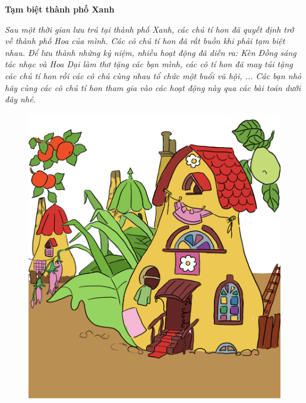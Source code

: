 	\centerline{\textbf{\color{toancuabi}Tạm biệt thành phố Xanh}}
	\vskip 0.1cm
	\begin{multicols}{2}
		\textit{Sau một thời gian lưu trú tại thành phố Xanh, các chú tí hon đã quyết định trở về thành phố Hoa của mình. Các cô chú tí hon đã rất buồn khi phải tạm biệt nhau. Để lưu thành những kỷ niệm, nhiều hoạt động đã diễn ra: Kèn Đồng sáng tác nhạc và Hoa Dại làm thơ tặng các bạn mình, các cô tí hon đã may túi tặng các chú tí hon rồi các cô chú cùng nhau tổ chức một buổi vũ hội, ... Các bạn nhỏ hãy cùng các cô chú tí hon tham gia vào các hoạt động này qua các bài toán dưới đây nhé.}
		\begin{figure}[H]
			\centering
			\vspace*{-5pt}
			\captionsetup{labelformat= empty, justification=centering}
			\includegraphics[width=1\linewidth]{Hinh10_ThanhPhoXanh}
			\vspace*{-10pt}
		\end{figure}
	\end{multicols}
	\vskip 0.1cm
